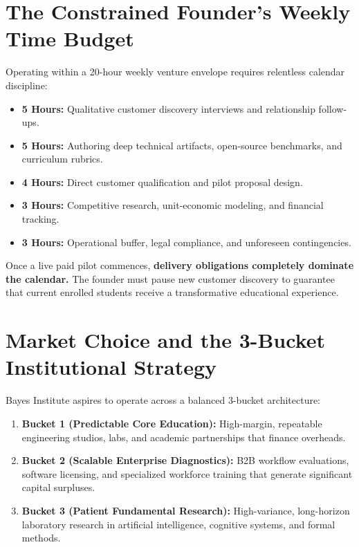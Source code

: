 \section{The Constrained Founder's Weekly Time Budget}

Operating within a 20-hour weekly venture envelope requires relentless calendar discipline:
\begin{itemize}[leftmargin=12pt,itemsep=1pt,topsep=1pt]
  \item \textbf{5 Hours:} Qualitative customer discovery interviews and relationship follow-ups.
  \item \textbf{5 Hours:} Authoring deep technical artifacts, open-source benchmarks, and curriculum rubrics.
  \item \textbf{4 Hours:} Direct customer qualification and pilot proposal design.
  \item \textbf{3 Hours:} Competitive research, unit-economic modeling, and financial tracking.
  \item \textbf{3 Hours:} Operational buffer, legal compliance, and unforeseen contingencies.
\end{itemize}

Once a live paid pilot commences, \textbf{delivery obligations completely dominate the calendar.} The founder must pause new customer discovery to guarantee that current enrolled students receive a transformative educational experience.

\section{Market Choice and the 3-Bucket Institutional Strategy}

Bayes Institute aspires to operate across a balanced 3-bucket architecture:
\begin{enumerate}[leftmargin=12pt,itemsep=1pt,topsep=1pt,parsep=0pt]
  \item \textbf{Bucket 1 (Predictable Core Education):} High-margin, repeatable engineering studios, labs, and academic partnerships that finance overheads.
  \item \textbf{Bucket 2 (Scalable Enterprise Diagnostics):} B2B workflow evaluations, software licensing, and specialized workforce training that generate significant capital surpluses.
  \item \textbf{Bucket 3 (Patient Fundamental Research):} High-variance, long-horizon laboratory research in artificial intelligence, cognitive systems, and formal methods.
\end{enumerate}

